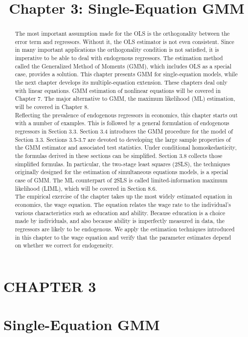 \documentclass[10pt]{article}
\title{Chapter 3: Single-Equation GMM}
\author{}
\date{}
\begin{document}
\maketitle

\section*{CHAPTER 3}
\section*{Single-Equation GMM}
\begin{abstract}
The most important assumption made for the OLS is the orthogonality between the error term and regressors. Without it, the OLS estimator is not even consistent. Since in many important applications the orthogonality condition is not satisfied, it is imperative to be able to deal with endogenous regressors. The estimation method called the Generalized Method of Moments (GMM), which includes OLS as a special case, provides a solution. This chapter presents GMM for single-equation models, while the next chapter develops its multiple-equation extension. These chapters deal only with linear equations. GMM estimation of nonlinear equations will be covered in Chapter 7. The major alternative to GMM, the maximum likelihood (ML) estimation, will be covered in Chapter 8.\\
Reflecting the prevalence of endogenous regressors in economics, this chapter starts out with a number of examples. This is followed by a general formulation of endogenous regressors in Section 3.3. Section 3.4 introduces the GMM procedure for the model of Section 3.3. Sections 3.5-3.7 are devoted to developing the large sample properties of the GMM estimator and associated test statistics. Under conditional homoskedasticity, the formulas derived in these sections can be simplified. Section 3.8 collects those simplified formulas. In particular, the two-stage least squares (2SLS), the techniques originally designed for the estimation of simultaneous equations models, is a special case of GMM. The ML counterpart of 2SLS is called limited-information maximum likelihood (LIML), which will be covered in Section 8.6.\\
The empirical exercise of the chapter takes up the most widely estimated equation in economics, the wage equation. The equation relates the wage rate to the individual's various characteristics such as education and ability. Because education is a choice made by individuals, and also because ability is imperfectly measured in data, the regressors are likely to be endogenous. We apply the estimation techniques introduced in this chapter to the wage equation and verify that the parameter estimates depend on whether we correct for endogeneity.
\end{abstract}
\end{document}
